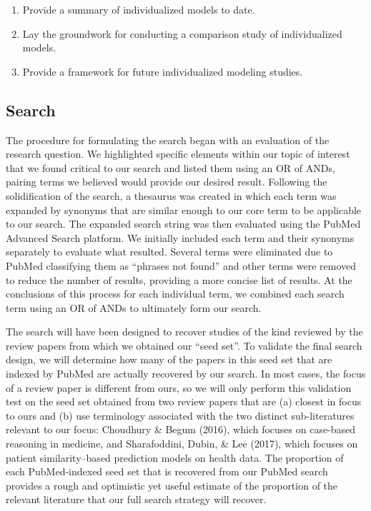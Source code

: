 \documentclass[preprint, 3p,
authoryear]{elsarticle} %
\providecommand{\tightlist}{%
  \setlength{\itemsep}{0pt}\setlength{\parskip}{0pt}}
\begin{document}
\begin{enumerate}
\def\labelenumi{\arabic{enumi}.}
\tightlist
\item
  Provide a summary of individualized models to date.
\item
  Lay the groundwork for conducting a comparison study of individualized
  models.
\item
  Provide a framework for future individualized modeling studies.
\end{enumerate}

\hypertarget{search-1}{%
\subsection{Search}\label{search-1}}

\label{sec:appendix-search}

The procedure for formulating the search began with an evaluation of the
research question. We highlighted specific elements within our topic of
interest that we found critical to our search and listed them using an
OR of ANDs, pairing terms we believed would provide our desired result.
Following the solidification of the search, a thesaurus was created in
which each term was expanded by synonyms that are similar enough to our
core term to be applicable to our search. The expanded search string was
then evaluated using the PubMed Advanced Search platform. We initially
included each term and their synonyms separately to evaluate what
resulted. Several terms were eliminated due to PubMed classifying them
as ``phrases not found'' and other terms were removed to reduce the
number of results, providing a more concise list of results. At the
conclusions of this process for each individual term, we combined each
search term using an OR of ANDs to ultimately form our search.

The search will have been designed to recover studies of the kind
reviewed by the review papers from which we obtained our ``seed set''.
To validate the final search design, we will determine how many of the
papers in this seed set that are indexed by PubMed are actually
recovered by our search. In most cases, the focus of a review paper is
different from ours, so we will only perform this validation test on the
seed set obtained from two review papers that are (a) closest in focus
to ours and (b) use terminology associated with the two distinct
sub-literatures relevant to our focus: Choudhury \& Begum (2016), which
focuses on case-based reasoning in medicine, and Sharafoddini, Dubin, \&
Lee (2017), which focuses on patient similarity--based prediction models
on health data. The proportion of each PubMed-indexed seed set that is
recovered from our PubMed search provides a rough and optimistic yet
useful estimate of the proportion of the relevant literature that our
full search strategy will recover.
\end{document}
